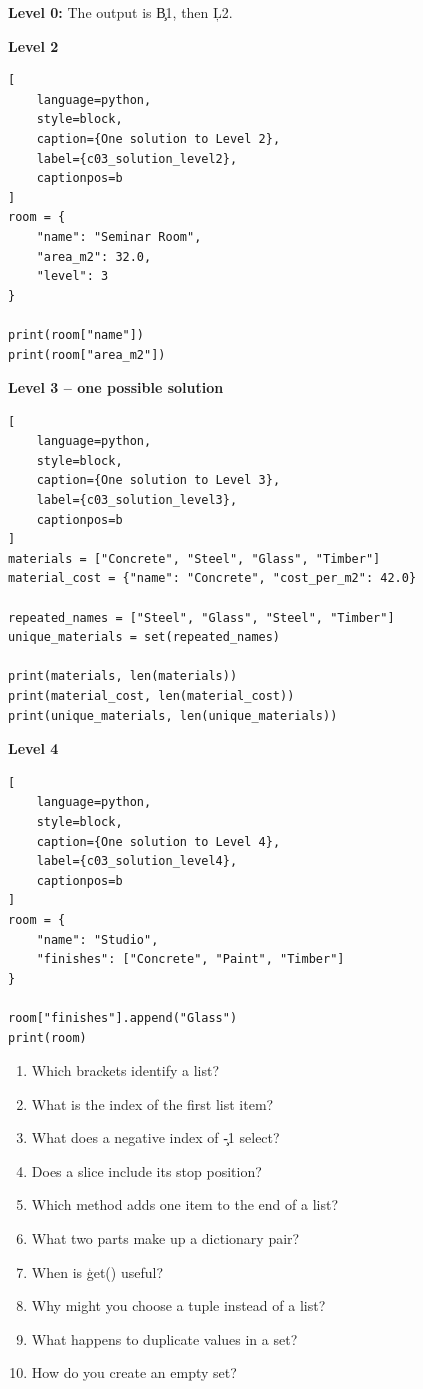 \textbf{Level 0:} The output is \c{B1}, then \c{L2}.

\textbf{Level 2}

\begin{lstlisting}[
    language=python,
    style=block,
    caption={One solution to Level 2},
    label={c03_solution_level2},
    captionpos=b
]
room = {
    "name": "Seminar Room",
    "area_m2": 32.0,
    "level": 3
}

print(room["name"])
print(room["area_m2"])
\end{lstlisting}

\textbf{Level 3 -- one possible solution}

\begin{lstlisting}[
    language=python,
    style=block,
    caption={One solution to Level 3},
    label={c03_solution_level3},
    captionpos=b
]
materials = ["Concrete", "Steel", "Glass", "Timber"]
material_cost = {"name": "Concrete", "cost_per_m2": 42.0}

repeated_names = ["Steel", "Glass", "Steel", "Timber"]
unique_materials = set(repeated_names)

print(materials, len(materials))
print(material_cost, len(material_cost))
print(unique_materials, len(unique_materials))
\end{lstlisting}

\textbf{Level 4}

\begin{lstlisting}[
    language=python,
    style=block,
    caption={One solution to Level 4},
    label={c03_solution_level4},
    captionpos=b
]
room = {
    "name": "Studio",
    "finishes": ["Concrete", "Paint", "Timber"]
}

room["finishes"].append("Glass")
print(room)
\end{lstlisting}


\begin{enumerate}
    \item Which brackets identify a list?
    \item What is the index of the first list item?
    \item What does a negative index of \c{-1} select?
    \item Does a slice include its stop position?
    \item Which method adds one item to the end of a list?
    \item What two parts make up a dictionary pair?
    \item When is \c{get()} useful?
    \item Why might you choose a tuple instead of a list?
    \item What happens to duplicate values in a set?
    \item How do you create an empty set?
\end{enumerate}

